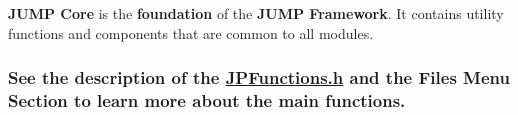 {\bfseries JUMP Core} is the {\bfseries foundation} of the {\bfseries JUMP Framework}. It contains utility functions and components that are common to all modules.\par
 \par
 \subsubsection*{See the description of the  \hyperlink{_j_p_functions_8h}{JPFunctions.h} and the {\bfseries Files Menu Section} to learn more about the main functions.}